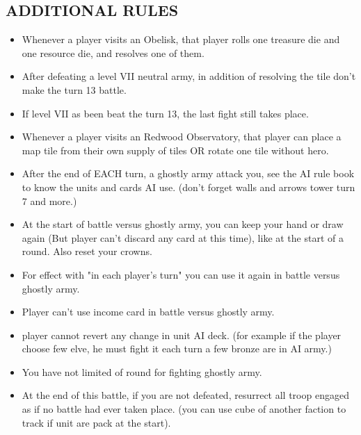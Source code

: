 \begin{multicols*}{2}
\subsection*{\MakeUppercase{Additional Rules}}
    \begin{itemize}
      \item Whenever a player visits an Obelisk, that player rolls one treasure die and one resource die, and resolves one of them.
      \item After defeating a level VII neutral army, in addition of resolving the tile don't make the turn 13 battle.
      \item If level VII as been beat the turn 13, the last fight still takes place.
      \item Whenever a player visits an Redwood Observatory, that player can place a map tile from their own supply of tiles OR rotate one tile without hero.
      \item After the end of EACH turn, a ghostly army attack you, see the AI rule book to know the units and cards AI use. (don't forget walls
      and arrows tower turn 7 and more.)
      \item At the start of battle versus ghostly army, you can keep your hand or draw again (But player can't discard any card at this time), like at the start of a round. Also reset your crowns.
      \item For effect with "in each player's turn" you can use it again in battle versus ghostly army.
      \item Player can't use income card in battle versus ghostly army.
      \item player cannot revert any change in unit AI deck. (for example if the player choose few elve, he must fight it each turn a few bronze are in AI army.)
      \item You have not limited of round for fighting ghostly army.
      \item At the end of this battle, if you are not defeated, resurrect all troop engaged as if no battle had ever taken place. (you can use cube of another faction to track if unit are pack at the start).
    \end{itemize}
\end{multicols*}
